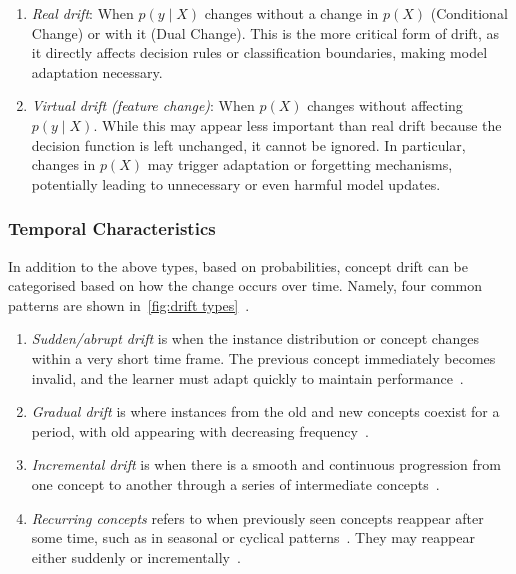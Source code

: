 \begin{enumerate}
    \item \textit{Real drift}: When $p(y \mid X)$ changes without a change in $p(X)$ (Conditional Change) or with it (Dual Change). This is the more critical form of drift, as it directly affects decision rules or classification boundaries, making model adaptation necessary.
    
    \item \textit{Virtual drift (feature change)}: When $p(X)$ changes without affecting $p(y \mid X)$. While this may appear less important than real drift because the decision function is left unchanged, it cannot be ignored. In particular, changes in $p(X)$ may trigger adaptation or forgetting mechanisms, potentially leading to unnecessary or even harmful model updates.
\end{enumerate}

\subsubsection{Temporal Characteristics}
In addition to the above types, based on probabilities, concept drift can be categorised based on how the change occurs over time. Namely, four common patterns are shown in~\cref{fig:drift types}~\cite{Lu_2018}.

\begin{enumerate}
    \item \textit{Sudden/abrupt drift} is when the instance distribution or concept changes within a very short time frame. The previous concept immediately becomes invalid, and the learner must adapt quickly to maintain performance~\cite{Korycki_2022}.
    
    \item \textit{Gradual drift} is where instances from the old and new concepts coexist for a period, with old appearing with decreasing frequency~\cite{Korycki_2022}.
    
    \item \textit{Incremental drift} is when there is a smooth and continuous progression from one concept to another through a series of intermediate concepts~\cite{Gama_2014, Korycki_2022}.
    
    \item \textit{Recurring concepts} refers to when previously seen concepts reappear after some time, such as in seasonal or cyclical patterns~\cite{Gama_2014}. They may reappear either suddenly or incrementally~\cite{Guzy_2020}.
\end{enumerate}

